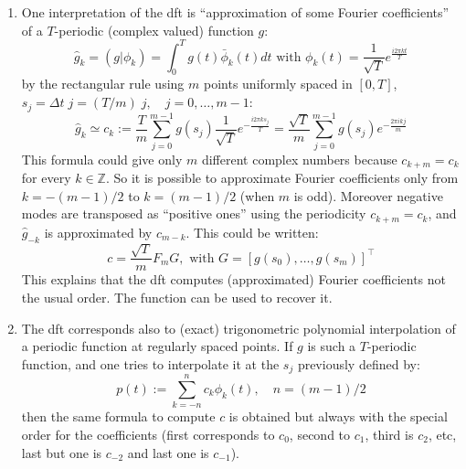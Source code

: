 \begin{mandescription}
\begin{enumerate}
\item One interpretation of the dft is ``approximation of some Fourier coefficients'' of
a $T$-periodic (complex valued) function $g$:
$$
      \hat{g}_k = ( g | \phi_k ) = \int_0^T g(t) \bar{\phi}_k(t) dt \mbox{ with } \phi_k(t) = \frac{1}{\sqrt{T}} e^{\frac{i 2\pi k t}{T}}
$$
by the rectangular rule using $m$ points uniformly spaced in $[0,T]$, $s_j = \Delta t \; j = (T/m) \; j, \quad j=0,\dots, m-1$:
$$
      \hat{g}_k \simeq c_k := \frac{T}{m} \sum_{j=0}^{m-1} g(s_j) \frac{1}{\sqrt{T}} e^{-\frac{i 2\pi  k s_j}{T}} 
             =  \frac{\sqrt{T}}{m} \sum_{j=0}^{m-1}  g(s_j)  e^{-\frac{2\pi i k j}{m}}
$$
This formula could give only $m$ different complex numbers because $c_{k+m} = c_k$ for every $k \in {\mathbb Z}$. So
it is possible to approximate Fourier coefficients only from $k = -(m-1)/2$ to  $k = (m-1)/2$ (when $m$ is
odd). Moreover negative modes are transposed as ``positive ones'' using the periodicity  $c_{k+m} = c_k$, and
$\hat{g}_{-k}$ is approximated by $c_{m-k}$. This could be written:
$$
   c = \frac{\sqrt{T}}{m} F_m G, \mbox{  with } G = [ g(s_0), \dots, g(s_m) ]^{\top}
$$
This explains that the dft computes (approximated) Fourier coefficients not the usual order. The function 
 can be used to recover it.

\item The dft corresponds also to (exact) trigonometric polynomial interpolation of a periodic function at regularly spaced 
points. If $g$ is such a $T$-periodic function, and one tries to interpolate it at the $s_j$ previously defined
by:
$$
   p(t) := \sum_{k=-n}^n c_k \phi_k(t), \quad n = (m-1)/2
$$
then the same formula to compute $c$ is obtained but always with the special order for the coefficients
(first corresponds to $c_0$, second to $c_1$, third is $c_2$, etc, last but one is $c_{-2}$ and 
last one is $c_{-1}$).    

\end{enumerate}

\end{mandescription}
 
